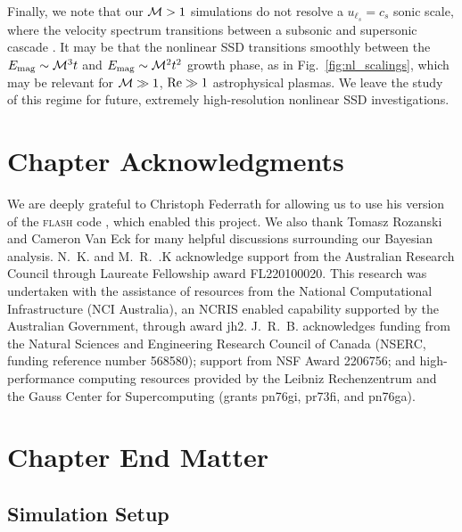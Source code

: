     Finally, we note that our $\mathcal{M} > 1$ simulations do not resolve a $u_{\ell_s} = c_s$ sonic scale, where the velocity spectrum transitions between a subsonic and supersonic cascade \citep{Federrath2021_the_sonic_scale, Beattie2025_nature_astronomy}. It may be that the nonlinear SSD transitions smoothly between the $E_\mathrm{mag} \sim \mathcal{M}^3 t$ and $E_\mathrm{mag} \sim \mathcal{M}^2 t^2$ growth phase, as in Fig.~\ref{fig:nl_scalings}, which may be relevant for $\mathcal{M} \gg 1$, $\mathrm{Re} \gg 1$ astrophysical plasmas. We leave the study of this regime for future, extremely high-resolution nonlinear SSD investigations.

\section*{Chapter Acknowledgments}

    We are deeply grateful to Christoph Federrath for allowing us to use his version of the \textsc{flash} code \citep{Federrath2021_the_sonic_scale, Federrath2022_TurbGen}, which enabled this project. We also thank Tomasz Rozanski and Cameron Van Eck for many helpful discussions surrounding our Bayesian analysis. N.~K. and M.~R.~.K acknowledge support from the Australian Research Council through Laureate Fellowship award FL220100020. This research was undertaken with the assistance of resources from the National Computational Infrastructure (NCI Australia), an NCRIS enabled capability supported by the Australian Government, through award jh2. J.~R.~B. acknowledges funding from the Natural Sciences and Engineering Research Council of Canada (NSERC, funding reference number 568580); support from NSF Award 2206756; and high-performance computing resources provided by the Leibniz Rechenzentrum and the Gauss Center for Supercomputing (grants pn76gi, pr73fi, and pn76ga).

\section{Chapter End Matter}

\subsection{Simulation Setup}
\label{app:ssd-nl:simulation-setup}

